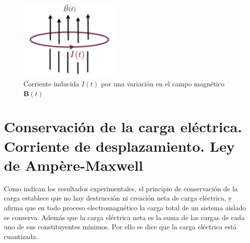 \documentclass[11pt,fleqn]{book} %
\begin{document}
\begin{figure}[h]
\centering
\includegraphics[width=0.45\textwidth]{Pictures/AutoIn.pdf}
\caption{Corriente inducida $I(t)$ por una variaci\'on en el campo magn\'etico $\textbf{B}(t)$}
\end{figure}

\section{Conservaci\'on de la carga el\'ectrica. Corriente de desplazamiento. Ley de Amp\`ere-Maxwell}
Como indican los resultados experimentales, el principio de conservaci\'on de la carga  establece que no hay destrucci\'on ni creaci\'on neta de carga el\'ectrica, y afirma que en todo proceso electromagn\'etico la carga total de un sistema aislado se conserva. Adem\'as que la  carga el\'ectrica neta es la suma de las cargas de cada uno de sus constituyentes m\'inimos. Por ello se dice que la carga el\'ectrica est\'a cuantizada.\\\\
\end{document}
